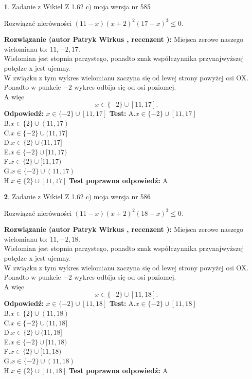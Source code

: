 \documentclass[12pt, a4paper]{article}
\theoremstyle{definition} %
\newtheorem{zad}{}
\newcommand{\zadStart}[1]{\begin{zad}#1\newline}
\newcommand{\zadStop}{\end{zad}}
\newcommand{\rozwStart}[2]{\noindent \textbf{Rozwiązanie (autor #1 , recenzent #2): }\newline}
\newcommand{\rozwStop}{\newline}
\newcommand{\odpStart}{\noindent \textbf{Odpowiedź:}\newline}
\newcommand{\odpStop}{\newline}
\newcommand{\testStart}{\noindent \textbf{Test:}\newline}
\newcommand{\testStop}{\newline}
\newcommand{\kluczStart}{\noindent \textbf{Test poprawna odpowiedź:}\newline}
\newcommand{\kluczStop}{\newline}
\begin{document}
\zadStart{Zadanie z Wikieł Z 1.62 c) moja wersja nr 585}

Rozwiązać nierówności $(11-x)(x+2)^{2}(17-x)^{3}\le0$.
\zadStop
\rozwStart{Patryk Wirkus}{}
Miejsca zerowe naszego wielomianu to: $11, -2, 17$.\\
Wielomian jest stopnia parzystego, ponadto znak współczynnika przy\linebreak najwyższej potędze x jest ujemny.\\ W związku z tym wykres wielomianu zaczyna się od lewej strony powyżej osi OX.\\
Ponadto w punkcie $-2$ wykres odbija się od osi poziomej.\\
A więc $$x \in \{-2\} \cup [11,17].$$
\rozwStop
\odpStart
$x \in \{-2\} \cup [11,17]$
\odpStop
\testStart
A.$x \in \{-2\} \cup [11,17]$\\
B.$x \in \{2\} \cup (11,17)$\\
C.$x \in \{-2\} \cup (11,17]$\\
D.$x \in \{2\} \cup (11,17]$\\
E.$x \in \{-2\} \cup [11,17)$\\
F.$x \in \{2\} \cup [11,17)$\\
G.$x \in \{-2\} \cup (11,17)$\\
H.$x \in \{2\} \cup [11,17]$
\testStop
\kluczStart
A
\kluczStop



\zadStart{Zadanie z Wikieł Z 1.62 c) moja wersja nr 586}

Rozwiązać nierówności $(11-x)(x+2)^{2}(18-x)^{3}\le0$.
\zadStop
\rozwStart{Patryk Wirkus}{}
Miejsca zerowe naszego wielomianu to: $11, -2, 18$.\\
Wielomian jest stopnia parzystego, ponadto znak współczynnika przy\linebreak najwyższej potędze x jest ujemny.\\ W związku z tym wykres wielomianu zaczyna się od lewej strony powyżej osi OX.\\
Ponadto w punkcie $-2$ wykres odbija się od osi poziomej.\\
A więc $$x \in \{-2\} \cup [11,18].$$
\rozwStop
\odpStart
$x \in \{-2\} \cup [11,18]$
\odpStop
\testStart
A.$x \in \{-2\} \cup [11,18]$\\
B.$x \in \{2\} \cup (11,18)$\\
C.$x \in \{-2\} \cup (11,18]$\\
D.$x \in \{2\} \cup (11,18]$\\
E.$x \in \{-2\} \cup [11,18)$\\
F.$x \in \{2\} \cup [11,18)$\\
G.$x \in \{-2\} \cup (11,18)$\\
H.$x \in \{2\} \cup [11,18]$
\testStop
\kluczStart
A
\kluczStop
\end{document}
